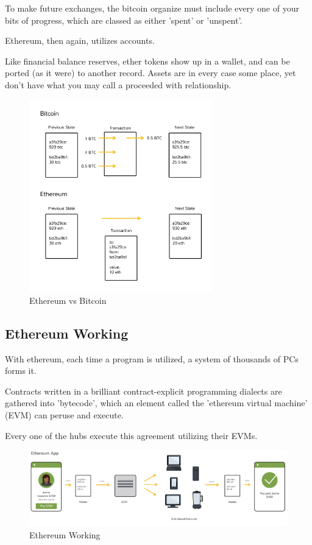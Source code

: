To make future exchanges, the bitcoin organize must include every one of your bits of progress, which are classed as either 'spent' or 'unspent'. 

Ethereum, then again, utilizes accounts. 

Like financial balance reserves, ether tokens show up in a wallet, and can be ported (as it were) to another record. Assets are in every case some place, yet don't have what you may call a proceeded with relationship.
\begin{figure}[h]
	\centering
	\includegraphics[width=300px]{figures/Ethereum/02.png}
	\caption{Ethereum vs Bitcoin}
	\label{fig:ipfs1}
\end{figure}
\newpage
\subsection{Ethereum Working}
With ethereum, each time a program is utilized, a system of thousands of PCs forms it. 

Contracts written in a brilliant contract-explicit programming dialects are gathered into 'bytecode', which an element called the 'ethereum virtual machine' (EVM) can peruse and execute. 

Every one of the hubs execute this agreement utilizing their EVMs.
\begin{figure}[h]
	\centering
	\includegraphics[width=450px]{figures/Ethereum/01.png}
	\caption{Ethereum Working}
	\label{fig:ipfs1}
\end{figure}

